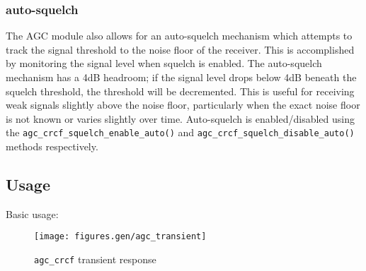 \subsubsection{auto-squelch}
The AGC module also allows for an auto-squelch mechanism which attempts to
track the signal threshold to the noise floor of the receiver.
This is accomplished by monitoring the signal level when squelch is enabled.
The auto-squelch mechanism has a 4dB headroom; if the signal level drops below
4dB beneath the squelch threshold, the threshold will be decremented.
This is useful for receiving weak signals slightly above the noise floor,
particularly when the exact noise floor is not known or varies slightly over
time.
Auto-squelch is enabled/disabled using the
{\tt agc\_crcf\_squelch\_enable\_auto()} and 
{\tt agc\_crcf\_squelch\_disable\_auto()} methods respectively.

\subsection{Usage}
Basic usage:


\begin{figure}
\centering
  \texttt{[image: figures.gen/agc\_transient]}
\caption{{\tt agc\_crcf} transient response}
\label{fig:module:agc:transient}
\end{figure}


